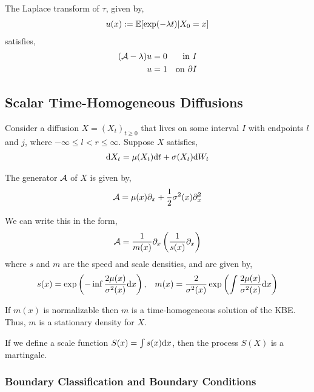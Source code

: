 \documentclass[12pt]{article}
\begin{document}
\begin{lemma}
The Laplace transform of \( \tau \), given by,
\begin{align*}
    u(x) := \mathbb{E}[\exp(-\lambda t) | X_0 = x]
\end{align*}
satisfies,
\begin{align*}
    (\mathcal{A} - \lambda)u = 0 && \text{in }I\\
    u=1 && \text{on }\partial I
\end{align*}

\end{lemma}

\subsection{Scalar Time-Homogeneous Diffusions}

Consider a diffusion \( X = (X_t)_{t\geq 0} \) that lives on some interval \( I \) with endpoints \( l \) and \( j  \), where \( -\infty \leq l < r\leq \infty \). Suppose \( X \) satisfies,
\begin{align*}
    \mathrm{d} X_t = \mu(X_t)\mathrm{d} t + \sigma(X_t) \mathrm{d} W_t
\end{align*}

The generator \( \mathcal{A} \) of \( X \) is given by,
\begin{align*}
    \mathcal{A} = \mu(x)\partial_x + \frac{1}{2}\sigma^2(x)\partial_x^2
\end{align*}

We can write this in the form,
\begin{align*}
    \mathcal{A} = \frac{1}{m(x)} \partial_x \left( \frac{1}{s(x)} \partial_x \right)
\end{align*}
where \( s \) and \( m \) are the speed and scale densities, and are given by,
\begin{align*}
    s(x) = \exp \left( -\inf \frac{2\mu(x)}{\sigma^2(x)} \mathrm{d} x \right)
    ,&&
    m(x) = \frac{2}{\sigma^2(x)} \exp \left( \int \frac{2\mu(x)}{\sigma^2(x)} \mathrm{d} x \right)
\end{align*}

If \( m(x) \) is normalizable then \( m \) is a time-homogeneous solution of the KBE. Thus, \( m   \) is a stationary density for \( X \).

If we define a scale function \( S(x) = \int s(x) \mathrm{d} x \), then the process \( S(X) \) is a martingale.

\subsubsection{Boundary Classification and Boundary Conditions}
\end{document}
